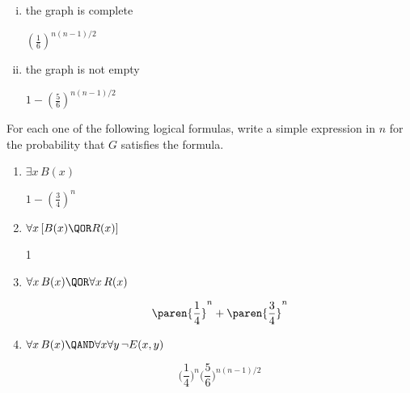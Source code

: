 \begin{problem}
\begin{enumerate}[(i)]
\item  the graph is complete
\begin{solution}
	$(\tfrac{1}{6})^{n(n-1)/2}$
\end{solution}\brule{0.5in}

%

%

\item the graph is not empty
\begin{solution}
$1 - (\tfrac{5}{6})^{n(n-1)/2}$
\end{solution}\brule{0.5in}

\end{enumerate}

\ppart For each one of the following logical formulas, write a simple
expression in $n$ for the probability that $G$ satisfies the formula.

\begin{enumerate}

\item
$\exists x\, B(x)$ \brule{0.5in}

\begin{solution}
$1 - (\tfrac{3}{4})^n$
\end{solution}

\item  $\forall x\, [B(x) \QOR R(x)]$ \brule{0.5in}

\begin{solution}
1
\end{solution}

\item  $\forall x\, B(x) \QOR \forall x\, R(x)$\brule{0.5in}

\begin{solution}
\[
\paren{\frac{1}{4}}^n + \paren{\frac{3}{4}}^n
\]
\end{solution}

\item $\forall x\, B(x) \QAND \forall x\forall y\, \neg E(x,y)$\brule{0.5in}

\begin{solution}
\[
\bigl(\frac{1}{4}\bigr)^n\bigl(\frac{5}{6}\bigr)^{n(n-1)/2}
\]
\end{solution}


\end{enumerate}
\end{problem}
